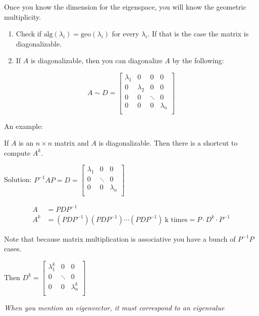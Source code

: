 \documentclass[
]{article}
\newcounter{example}
\begin{document}
Once you know the dimension for the eigenspace, you will know the
geometric multiplicity.

\begin{enumerate}
\def\labelenumi{\arabic{enumi}.}
\setcounter{enumi}{2}
\item
  Check if
  $\text{alg}\left( \lambda_{i} \right) = \text{geo}\left( \lambda_{i} \right)$
  for every $\lambda_{i}$. If that is the case the matrix is
  diagonalizable.
\item
  If $A$ is diagonalizable, then you can diagonalize $A$ by the
  following:
\end{enumerate}

$$A\sim D = \begin{bmatrix}
\lambda_{1} & 0 & 0 & 0 \\
0 & \lambda_{2} & 0 & 0 \\
0 & 0 & \ddots & 0 \\
0 & 0 & 0 & \lambda_{n} \\
\end{bmatrix}$$

An example:

If $A$ is an $n \times n$ matrix and $A$ is diagonalizable. Then
there is a shortcut to compute $A^{k}$.

Solution: $P^{- 1}AP = D = \begin{bmatrix}
\lambda_{1} & 0 & 0 \\
0 & \ddots & 0 \\
0 & 0 & \lambda_{n} \\
\end{bmatrix}$

\begin{align*}
A &= PDP^{- 1}
 \\
A^{k} &= \left( PDP^{- 1} \right)\left( PDP^{- 1} \right)\cdots\left( PDP^{- 1} \right)\ \text{k\ times} = P \cdot D^{k} \cdot P^{- 1}
\end{align*}


Note that because matrix multiplication is associative you have a bunch
of $P^{- 1}P$ cases.

Then $D^{k} = \begin{bmatrix}
\lambda_{1}^{k} & 0 & 0 \\
0 & \ddots & 0 \\
0 & 0 & \lambda_{n}^{k} \\
\end{bmatrix}$

\emph{When you mention an eigenvector, it must correspond to an
eigenvalue}
\end{document}
